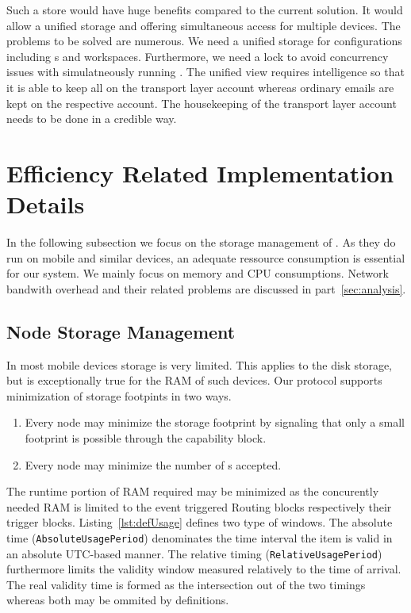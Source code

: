 Such a store would have huge benefits compared to the current solution. It would allow a unified storage and offering simultaneous access for multiple devices. The problems to be solved are numerous. We need a unified storage for configurations including s and workspaces. Furthermore, we need a lock to avoid concurrency issues with simulatneously running \VortexNodes{}. The unified view requires intelligence so that it is able to keep all \VortexMessages{} on the transport layer account  whereas ordinary emails are kept on the respective account. The housekeeping of the transport layer account needs to be done in a credible way. 

\chapter{Efficiency Related Implementation Details}
In the following subsection we focus on the storage management of \VortexNodes{}. As they do run on mobile and similar devices, an adequate ressource consumption is essential for our system. We mainly focus on memory and CPU consumptions. Network bandwith overhead and their related problems are discussed in part~\ref{sec:analysis}.

\section{Node Storage Management}
In most mobile devices storage is very limited. This applies to the disk storage, but is exceptionally true for the RAM of such devices. Our protocol supports minimization of storage footpints in two ways.
\begin{enumerate}
	\item Every node may minimize the storage footprint by signaling that only a small footprint is possible through the capability block.
	\item Every node may minimize the number of s accepted.
\end{enumerate}

The runtime portion of RAM required may be minimized as the concurently needed RAM is limited to the event triggered Routing blocks respectively their trigger blocks. Listing~\ref{lst:defUsage} defines two type of windows. The absolute time (\texttt{AbsoluteUsagePeriod}) denominates the time interval the item is valid in an absolute UTC-based manner. The relative timing (\texttt{RelativeUsagePeriod}) furthermore limits the validity window measured relatively to the time of arrival. The real validity time is formed as the intersection out of the two timings whereas both may be ommited by definitions.

